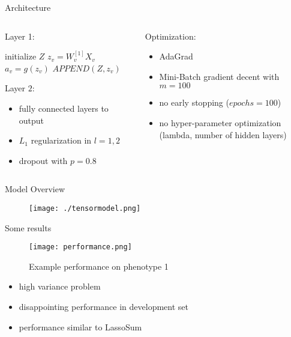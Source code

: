 \documentclass{beamer}
\begin{document}
\begin{frame}[t]{Architecture}
  \begin{columns}[t]
    \begin{column}{0.5\textwidth}
      Layer 1:
      \begin{algorithmic}
        \STATE initialize $Z$
        \STATE $z_v = W^{[1]}_vX_v$
        \STATE $a_v = g(z_v)$
        \STATE $APPEND(Z, z_v)$
        \ENDFOR
      \end{algorithmic}
      Layer $2$:\\
      \begin{itemize}
        \item fully connected layers to output
        \item $L_1$ regularization in $l=1,2$
        \item dropout with $p=0.8$
      \end{itemize}
    \end{column}
    \begin{column}{0.5\textwidth}
      Optimization:
      \begin{itemize}
        \item AdaGrad
        \item Mini-Batch gradient decent with $m=100$
        \item no early stopping ($epochs=100$)
        \item no hyper-parameter optimization (lambda, number of hidden layers)
      \end{itemize}
    \end{column}
  \end{columns}
\end{frame}

\begin{frame}[t]{Model Overview}
  \begin{figure}[htpb]
    \centering
    \texttt{[image: ./tensormodel.png]}
  \end{figure}
\end{frame}

\begin{frame}[t]{Some results}
  \begin{figure}[htpb]
    \centering
    \texttt{[image: performance.png]}
    \caption{Example performance on phenotype 1}
  \end{figure}
  \begin{itemize}
    \item high variance problem
    \item disappointing performance in development set
    \item performance similar to LassoSum
  \end{itemize}
\end{frame}
\end{document}
